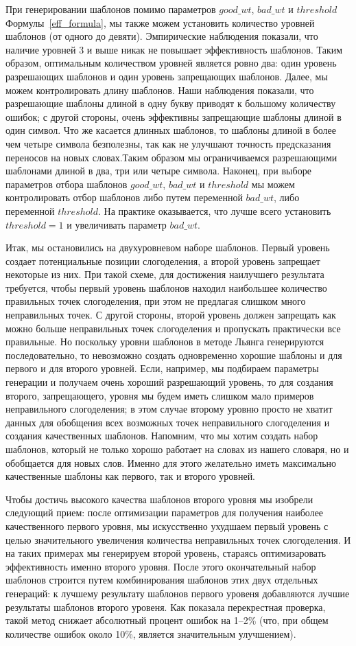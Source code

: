 \documentclass[12pt,a4paper,oneside]{extarticle}
\begin{document}
При генерировании шаблонов помимо параметров $good\_wt$, $bad\_wt$ и $threshold$ Формулы~\ref{eff_formula}, мы также можем установить количество уровней шаблонов (от одного до девяти). Эмпирические наблюдения показали, что наличие уровней 3 и выше никак не повышает эффективность шаблонов. Таким образом, оптимальным количеством уровней является ровно два: один уровень разрешающих шаблонов и один уровень запрещающих шаблонов. Далее, мы можем контролировать длину шаблонов. Наши наблюдения показали, что разрешающие шаблоны длиной в одну букву приводят к большому количеству ошибок; с другой стороны, очень эффективны запрещающие шаблоны длиной в один символ. Что же касается длинных шаблонов, то шаблоны длиной в более чем четыре символа безполезны, так как не улучшают точность предсказания переносов на новых словах.Таким образом мы ограничиваемся разрешающими шаблонами длиной в два, три или четыре символа. Наконец, при выборе параметров отбора шаблонов $good\_wt$, $bad\_wt$ и $threshold$ мы можем контролировать отбор шаблонов либо путем переменной $bad\_wt$, либо переменной $threshold$. На практике оказывается, что лучше всего установить $threshold = 1$ и увеличивать параметр $bad\_wt$.

Итак, мы остановились на двухуровневом наборе шаблонов. Первый уровень создает потенциальные позиции слогоделения, а второй уровень запрещает некоторые из них. При такой схеме, для достижения наилучшего результата требуется, чтобы первый уровень шаблонов находил наибольшее количество правильных точек слогоделения, при этом не предлагая слишком много неправильных точек. С другой стороны, второй уровень должен запрещать как можно больше неправильных точек слогоделения и пропускать практически все правильные. Но поскольку уровни шаблонов в методе Льянга генерируются последовательно, то невозможно создать одновременно хорошие шаблоны и для первого и для второго уровней. Если, например, мы подбираем параметры генерации и получаем очень хороший разрешающий уровень, то для создания второго, запрещающего, уровня мы будем иметь слишком мало примеров неправильного слогоделения; в этом случае второму уровню просто не хватит данных для обобщения всех возможных точек неправильного слогоделения и создания качественных шаблонов. Напомним, что мы хотим создать набор шаблонов, который не только хорошо работает на словах из нашего словаря, но и обобщается для новых слов. Именно для этого желательно иметь максимально качественные шаблоны как первого, так и второго уровней.

Чтобы достичь высокого качества шаблонов второго уровня мы изобрели следующий прием: после оптимизации параметров для получения наиболее качественного первого уровня, мы искусственно ухудшаем первый уровень с целью значительного увеличения количества неправильных точек слогоделения. И на таких примерах мы генерируем второй уровень, стараясь оптимизаровать эффективность именно второго уровня. После этого окончательный набор шаблонов строится путем комбинирования шаблонов этих двух отдельных генераций: к лучшему результату шаблонов первого уровеня добавляются лучшие результаты шаблонов второго уровеня. Как показала перекрестная проверка, такой метод снижает абсолютный процент ошибок на 1--2\% (что, при общем количестве ошибок около 10\%, является значительным улучшением).
\end{document}
